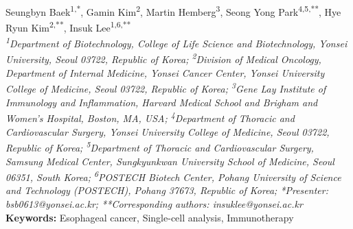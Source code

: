 \begin{center}
Seungbyn Baek\textsuperscript{1,*}, Gamin Kim\textsuperscript{2}, Martin Hemberg\textsuperscript{3}, Seong Yong Park\textsuperscript{4,5,**}, Hye Ryun Kim\textsuperscript{2,**}, Insuk Lee\textsuperscript{1,6,**} \\
\vspace{0.2cm}
\textit{\textsuperscript{1}Department of Biotechnology, College of Life Science and Biotechnology, Yonsei University, Seoul 03722, Republic of Korea; \textsuperscript{2}Division of Medical Oncology, Department of Internal Medicine, Yonsei Cancer Center, Yonsei University College of Medicine, Seoul 03722, Republic of Korea; \textsuperscript{3}Gene Lay Institute of Immunology and Inflammation, Harvard Medical School and Brigham and Women’s Hospital, Boston, MA, USA; \textsuperscript{4}Department of Thoracic and Cardiovascular Surgery, Yonsei University College of Medicine, Seoul 03722, Republic of Korea; \textsuperscript{5}Department of Thoracic and Cardiovascular Surgery, Samsung Medical Center, Sungkyunkwan University School of Medicine, Seoul 06351, South Korea; \textsuperscript{6}POSTECH Biotech Center, Pohang University of Science and Technology (POSTECH), Pohang 37673, Republic of Korea; *Presenter: bsb0613@yonsei.ac.kr; **Corresponding authors: insuklee@yonsei.ac.kr} \\
\vspace{0.2cm}
\textbf{Keywords:} Esophageal cancer, Single-cell analysis, Immunotherapy
\end{center}

